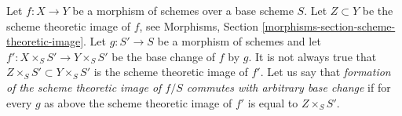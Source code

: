 \noindent
Let $f : X \to Y$ be a morphism of schemes over a base scheme $S$.
Let $Z \subset Y$ be the scheme theoretic image of $f$, see
Morphisms, Section \ref{morphisms-section-scheme-theoretic-image}.
Let $g : S' \to S$ be a morphism of schemes and let
$f' : X \times_S S' \to Y \times_S S'$ be the base change of $f$ by $g$.
It is not always true that $Z \times_S S' \subset Y \times_S S'$
is the scheme theoretic image of $f'$.
Let us say that {\it formation of the scheme theoretic image of $f/S$
commutes with arbitrary base change} if for every $g$ as above
the scheme theoretic image of $f'$ is equal to $Z \times_S S'$.

